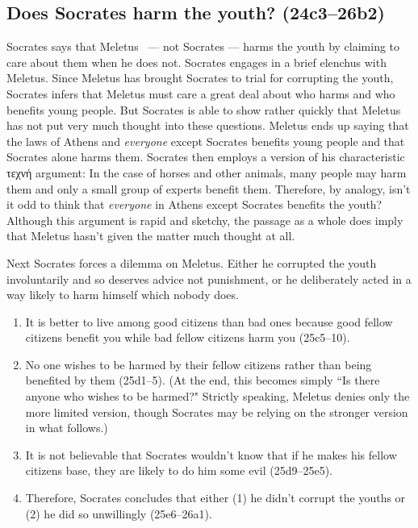 \documentclass[11pt]{article}
\begin{document}
\subsection{Does Socrates harm the youth? (24c3--26b2)}

Socrates says that Meletus ~--- not Socrates --- harms the youth by claiming to care about them when he does not. Socrates engages in a brief elenchus with Meletus.  Since Meletus has brought Socrates to trial for corrupting the youth, Socrates infers that Meletus must care a great deal about who harms and who benefits young people. But Socrates is able to show rather quickly that Meletus has not put very much thought into these questions.  Meletus ends up saying that the laws of Athens and \emph{everyone} except Socrates benefits young people and that Socrates alone harms them.  Socrates then employs a version of his characteristic τεχνή argument: In the case of horses and other animals, many people may harm them and only a small group of experts benefit them. Therefore, by analogy, isn't it odd to think that \emph{everyone} in Athens except Socrates benefits the youth?  Although this argument is rapid and sketchy, the passage as a whole does imply that Meletus hasn't given the matter much thought at all.

Next Socrates forces a dilemma on Meletus. Either he corrupted the youth involuntarily and so deserves advice not punishment, or he deliberately acted in a way likely to harm himself which nobody does.

\begin{enumerate}
    \item It is better to live among good citizens than bad ones because good fellow citizens benefit you while bad fellow citizens harm you (25c5--10).
    \item No one wishes to be harmed by their fellow citizens rather than being benefited by them (25d1--5). (At the end, this becomes simply ``Is there anyone who wishes to be harmed?" Strictly speaking, Meletus denies only the more limited version, though Socrates may be relying on the stronger version in what follows.)
    \item It is not believable that Socrates wouldn't know that if he makes his fellow citizens base, they are likely to do him some evil (25d9--25e5).
    \item Therefore, Socrates concludes that either (1) he didn't corrupt the youths or (2) he did so unwillingly (25e6--26a1).
\end{enumerate}
\end{document}
